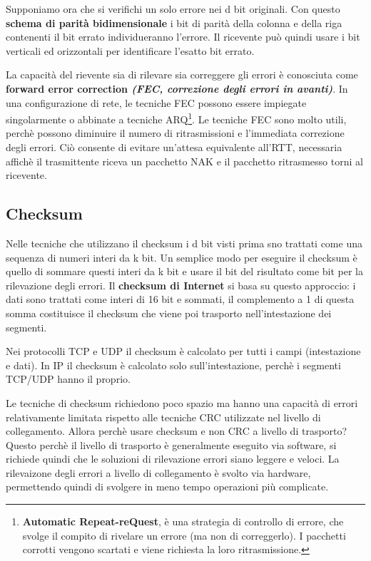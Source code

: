 \documentclass[11pt,a4paper]{book}
\begin{document}
Supponiamo ora che si verifichi un solo errore nei d bit originali. Con questo \textbf{schema di parità bidimensionale} i bit di parità della colonna e della riga contenenti il bit errato individueranno l'errore. Il ricevente può quindi usare i bit verticali ed orizzontali per identificare l'esatto bit errato.

La capacità del rievente sia di rilevare sia correggere gli errori è conosciuta come \textbf{forward error correction \textit{(FEC, correzione degli errori in avanti)}}. In una configurazione di rete, le tecniche FEC possono essere impiegate singolarmente o abbinate a tecniche ARQ\footnote{\textbf{Automatic Repeat-reQuest}, è una strategia di controllo di errore, che svolge il compito di rivelare un errore (ma non di correggerlo). I pacchetti corrotti vengono scartati e viene richiesta la loro ritrasmissione.}. Le tecniche FEC sono molto utili, perchè possono diminuire il numero di ritrasmissioni e l'immediata correzione degli errori. Ciò consente di evitare un'attesa equivalente all'RTT, necessaria affichè il trasmittente riceva un pacchetto NAK e il pacchetto ritrasmesso torni al ricevente.

\subsection{Checksum}
Nelle tecniche che utilizzano il checksum i d bit visti prima sno trattati come una sequenza di numeri interi da k bit. Un semplice modo per eseguire il checksum è quello di sommare questi interi da k bit e usare il bit del risultato come bit per la rilevazione degli errori. Il \textbf{checksum di Internet} si basa su questo approccio: i dati sono trattati come interi di 16 bit e sommati, il complemento a 1 di questa somma costituisce il checksum che viene poi trasporto nell'intestazione dei segmenti.

Nei protocolli TCP e UDP il checksum è calcolato per tutti i campi (intestazione e dati). In IP il checksum è calcolato solo sull'intestazione, perchè i segmenti TCP/UDP hanno il proprio.

Le tecniche di checksum richiedono poco spazio ma hanno una capacità di errori relativamente limitata rispetto alle tecniche CRC utilizzate nel livello di collegamento. Allora perchè usare checksum e non CRC a livello di trasporto? Questo perchè il livello di trasporto è generalmente eseguito via software, si richiede quindi che le soluzioni di rilevazione errori siano leggere e veloci. La rilevaizone degli errori a livello di collegamento è svolto via hardware, permettendo quindi di svolgere in meno tempo operazioni più complicate.
\end{document}
